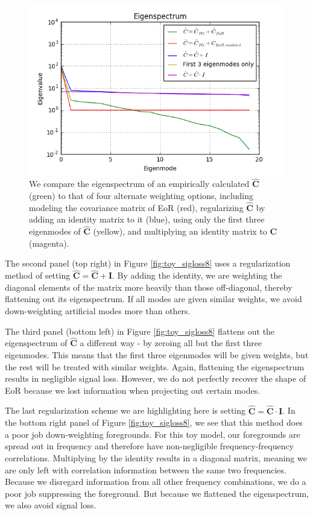 \documentclass[preprint2,numberedappendix,tighten]{aastex6}  %
\begin{document}
\begin{figure}
	\centering
	\includegraphics[trim={0.3cm 0.3cm 0.3cm 0.3cm},clip,width=\columnwidth]{plots/toy_sigloss14.png}
	\caption{We compare the eigenspectrum of an empirically calculated $\hat{\textbf{C}}$ (green) to that of four alternate weighting options, including modeling the covariance matrix of EoR (red), regularizing $\hat{\textbf{C}}$ by adding an identity matrix to it (blue), using only the first three eigenmodes of $\hat{\textbf{C}}$ (yellow), and multiplying an identity matrix to $\textbf{C}$ (magenta). }
	\label{fig:toy_sigloss14}
\end{figure}

The second panel (top right) in Figure \ref{fig:toy_sigloss8} uses a regularization method of setting $\hat{\textbf{C}} = \hat{\textbf{C}} + \textbf{I}$. By adding the identity, we are weighting the diagonal elements of the matrix more heavily than those off-diagonal, thereby flattening out its eigenspectrum. If all modes are given similar weights, we avoid down-weighting artificial modes more than others.  

The third panel (bottom left) in Figure \ref{fig:toy_sigloss8} flattens out the eigenspectrum of $\hat{\textbf{C}}$ a different way - by zeroing all but the first three eigenmodes. This means that the first three eigenmodes will be given weights, but the rest will be treated with similar weights. Again, flattening the eigenspectrum results in negligible signal loss. However, we do not perfectly recover the shape of EoR because we lost information when projecting out certain modes. 

The last regularization scheme we are highlighting here is setting $\hat{\textbf{C}} = \hat{\textbf{C}} \cdot \textbf{I}$. In the bottom right panel of Figure \ref{fig:toy_sigloss8}, we see that this method does a poor job down-weighting foregrounds. For this toy model, our foregrounds are spread out in frequency and therefore have non-negligible frequency-frequency correlations. Multiplying by the identity results in a diagonal matrix, meaning we are only left with correlation information between the same two frequencies. Because we disregard information from all other frequency combinations, we do a poor job suppressing the foreground. But because we flattened the eigenspectrum, we also avoid signal loss. 
\end{document}
